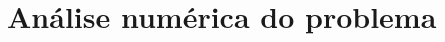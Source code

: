 \documentclass[idxtotoc,hyperref,openany]{labbook} %
\begin{document}
\tableofcontents


\newpage
\section{Análise numérica do problema}




\end{document}
